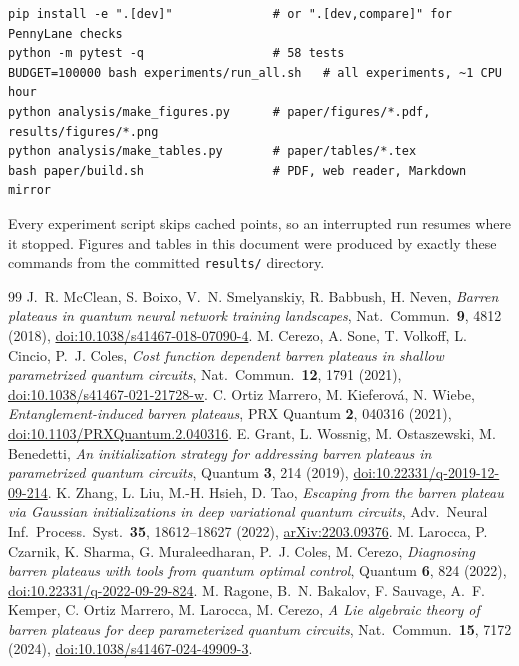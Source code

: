 \documentclass[11pt]{article}
\begin{document}
\begin{verbatim}
pip install -e ".[dev]"              # or ".[dev,compare]" for PennyLane checks
python -m pytest -q                  # 58 tests
BUDGET=100000 bash experiments/run_all.sh   # all experiments, ~1 CPU hour
python analysis/make_figures.py      # paper/figures/*.pdf, results/figures/*.png
python analysis/make_tables.py       # paper/tables/*.tex
bash paper/build.sh                  # PDF, web reader, Markdown mirror
\end{verbatim}
Every experiment script skips cached points, so an interrupted run resumes where it stopped. Figures and tables in this document were produced by exactly these commands from the committed \texttt{results/} directory.

\begin{thebibliography}{99}
 J.~R. McClean, S. Boixo, V.~N. Smelyanskiy, R. Babbush, H. Neven, \emph{Barren plateaus in quantum neural network training landscapes}, Nat.\ Commun.\ \textbf{9}, 4812 (2018), \href{https://doi.org/10.1038/s41467-018-07090-4}{doi:10.1038/s41467-018-07090-4}.
 M. Cerezo, A. Sone, T. Volkoff, L. Cincio, P.~J. Coles, \emph{Cost function dependent barren plateaus in shallow parametrized quantum circuits}, Nat.\ Commun.\ \textbf{12}, 1791 (2021), \href{https://doi.org/10.1038/s41467-021-21728-w}{doi:10.1038/s41467-021-21728-w}.
 C. Ortiz Marrero, M. Kieferov\'a, N. Wiebe, \emph{Entanglement-induced barren plateaus}, PRX Quantum \textbf{2}, 040316 (2021), \href{https://doi.org/10.1103/PRXQuantum.2.040316}{doi:10.1103/PRXQuantum.2.040316}.
 E. Grant, L. Wossnig, M. Ostaszewski, M. Benedetti, \emph{An initialization strategy for addressing barren plateaus in parametrized quantum circuits}, Quantum \textbf{3}, 214 (2019), \href{https://doi.org/10.22331/q-2019-12-09-214}{doi:10.22331/q-2019-12-09-214}.
 K. Zhang, L. Liu, M.-H. Hsieh, D. Tao, \emph{Escaping from the barren plateau via Gaussian initializations in deep variational quantum circuits}, Adv.\ Neural Inf.\ Process.\ Syst.\ \textbf{35}, 18612--18627 (2022), \href{https://arxiv.org/abs/2203.09376}{arXiv:2203.09376}.
 M. Larocca, P. Czarnik, K. Sharma, G. Muraleedharan, P.~J. Coles, M. Cerezo, \emph{Diagnosing barren plateaus with tools from quantum optimal control}, Quantum \textbf{6}, 824 (2022), \href{https://doi.org/10.22331/q-2022-09-29-824}{doi:10.22331/q-2022-09-29-824}.
 M. Ragone, B.~N. Bakalov, F. Sauvage, A.~F. Kemper, C. Ortiz Marrero, M. Larocca, M. Cerezo, \emph{A Lie algebraic theory of barren plateaus for deep parameterized quantum circuits}, Nat.\ Commun.\ \textbf{15}, 7172 (2024), \href{https://doi.org/10.1038/s41467-024-49909-3}{doi:10.1038/s41467-024-49909-3}.

\end{thebibliography}
\end{document}
